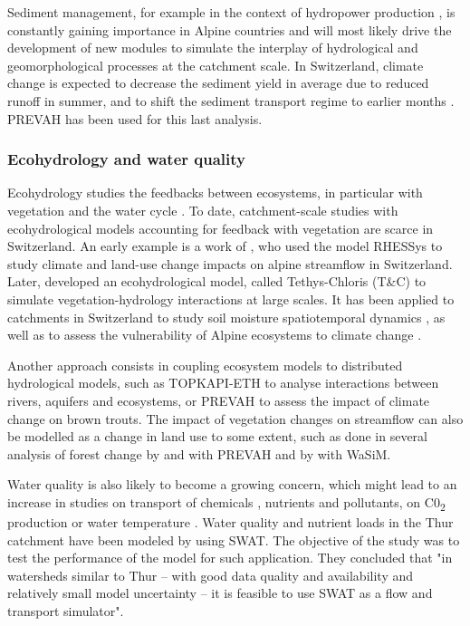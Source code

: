\documentclass[10pt,a4paper]{article}
\begin{document}
Sediment management, for example in the context of hydropower production \citep{RaymondPralong2015,Gabbud2016}, is constantly gaining importance in Alpine countries and will most likely drive the development of new modules to simulate the interplay of hydrological and geomorphological processes at the catchment scale. In Switzerland, climate change is expected to decrease the sediment yield in average due to reduced runoff in summer, and to shift the sediment transport regime to earlier months \citep{RaymondPralong2015}. PREVAH has been used for this last analysis.


\subsubsection{Ecohydrology and water quality}
\label{sec:application:ecohydrology}

Ecohydrology studies the feedbacks between ecosystems, in particular with vegetation and the water cycle \citep{tague200}. To date, catchment-scale studies with ecohydrological models accounting for feedback with vegetation are scarce in Switzerland. An early example is a work of \citet{zierl05}, who used the model RHESSys to study climate and land-use change impacts on alpine streamflow in Switzerland. Later, \citet{Fatichi2012, Fatichi2012a} developed an ecohydrological model, called Tethys-Chloris (T\&C) to simulate vegetation-hydrology interactions at large scales. It has been applied to catchments in Switzerland to study soil moisture spatiotemporal dynamics \citep{Fatichi2015a}, as well as to assess the vulnerability of Alpine ecosystems to climate change \citep{Mastrotheodoros2019}.

Another approach consists in coupling ecosystem models to distributed hydrological models, such as TOPKAPI-ETH \citep{Foglia2009, Pappas2015} to analyse interactions between rivers, aquifers and ecosystems, or PREVAH \citep{Junker2015} to assess the impact of climate change on brown trouts. The impact of vegetation changes on streamflow can also be modelled as a change in land use to some extent, such as done in several analysis of forest change by \citet{Koplin2013} and \citet{Schattan2013} with PREVAH and by \citet{Alaoui2014} with WaSiM.

Water quality is also likely to become a growing concern, which might lead to an increase in studies on transport of chemicals \citep{queloz2015}, nutrients and pollutants, on C0\textsubscript{2} production or water temperature \citep{michel2020}. Water quality and nutrient loads in the Thur catchment have been modeled by \citet{Abbaspour2007} using SWAT. The objective of the study was to test the performance of the model for such application. They concluded that "in watersheds similar to Thur – with good data quality and availability and relatively small model uncertainty – it is feasible to use SWAT as a flow and transport simulator". 
\end{document}
